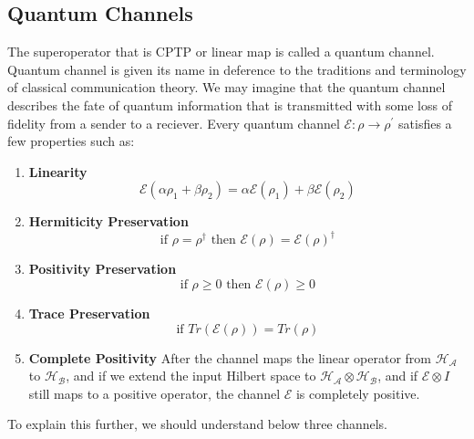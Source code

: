 \subsection{Quantum Channels}
The superoperator that is CPTP or linear map is called a quantum channel. Quantum channel is given its name in deference to the traditions and terminology of classical communication theory. We may imagine that the quantum channel describes the fate of quantum information that is transmitted with some loss of fidelity from a sender to a reciever. Every quantum channel $\mathcal{E} : \rho \rightarrow \rho^{'}$ satisfies a few properties such as:
\begin{enumerate}
    \item \textbf{Linearity}
    \begin{equation}
        \mathcal{E}(\alpha \rho_1 + \beta \rho_2) = \alpha\mathcal{E}(\rho_1) + \beta\mathcal{E}(\rho_2)
    \end{equation}
    \item \textbf{Hermiticity Preservation}
    \begin{equation}
        \text{if } \rho = \rho^{\dagger} \text{ then } \mathcal{E}(\rho) = \mathcal{E}(\rho)^{\dagger} 
    \end{equation}
    \item \textbf{Positivity Preservation}
    \begin{equation}
        \text{if } \rho \geq 0 \text{ then } \mathcal{E}(\rho) \geq 0 
    \end{equation}
    \item \textbf{Trace Preservation}
    \begin{equation}
        \text{if } Tr(\mathcal{E}(\rho)) = Tr(\rho) 
    \end{equation}
    \item \textbf{Complete Positivity}
    After the channel maps the linear operator from $\mathcal{H_A}$ to $\mathcal{H_B}$, and if we extend the input Hilbert space to $\mathcal{H_A} \otimes \mathcal{H_B}$, and if $\mathcal{E} \otimes I$ still maps to a positive operator, the channel $\mathcal{E}$ is completely positive.
\end{enumerate}
To explain this further, we should understand below three channels.
